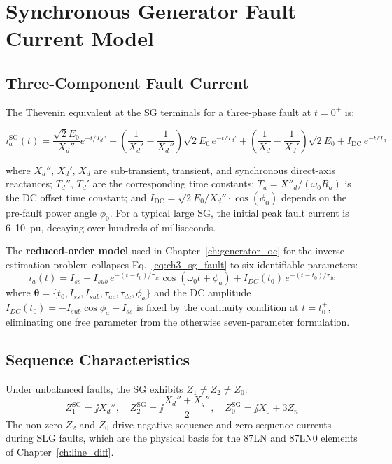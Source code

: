\section{Synchronous Generator Fault Current Model}
\label{sec:ch3_sg}

\subsection{Three-Component Fault Current}

The Thevenin equivalent at the SG terminals for a three-phase fault at $t=0^+$ is:

\begin{equation}
  i_a^\mathrm{SG}(t) =
    \frac{\sqrt{2} E_0}{X_d''} e^{-t/T_d''}
    + \left(\frac{1}{X_d'} - \frac{1}{X_d''}\right)\sqrt{2} E_0\, e^{-t/T_d'}
    + \left(\frac{1}{X_d} - \frac{1}{X_d'}\right)\sqrt{2} E_0
    + I_\mathrm{DC}\,e^{-t/T_a}
  \label{eq:ch3_sg_fault}
\end{equation}

where $X_d''$, $X_d'$, $X_d$ are sub-transient, transient, and synchronous
direct-axis reactances; $T_d''$, $T_d'$ are the corresponding time constants;
$T_a = X''_d / (\omega_0 R_a)$ is the DC offset time constant; and
$I_\mathrm{DC} = \sqrt{2} E_0 / X_d'' \cdot \cos(\phi_0)$ depends on the
pre-fault power angle $\phi_0$. For a typical large SG, the initial peak
fault current is 6--10~pu, decaying over hundreds of milliseconds.

The \textbf{reduced-order model} used in Chapter~\ref{ch:generator_oc}
for the inverse estimation problem collapses Eq.~\eqref{eq:ch3_sg_fault}
to six identifiable parameters:
\begin{equation}
  i_a(t) = I_{ss} + I_{sub}\,e^{-(t-t_0)/\tau_{ac}}\cos(\omega_0 t + \phi_a)
           + I_{DC}(t_0)\,e^{-(t-t_0)/\tau_{dc}}
  \label{eq:ch3_sg_reduced}
\end{equation}
where $\bm{\theta} = \{t_0, I_{ss}, I_{sub}, \tau_{ac}, \tau_{dc}, \phi_a\}$
and the DC amplitude $I_{DC}(t_0) = -I_{sub}\cos\phi_a - I_{ss}$
is fixed by the continuity condition at $t = t_0^+$, eliminating one
free parameter from the otherwise seven-parameter formulation.

\subsection{Sequence Characteristics}

Under unbalanced faults, the SG exhibits $Z_1 \neq Z_2 \neq Z_0$:
\begin{equation}
  Z_1^\mathrm{SG} = \jj X_d'', \quad
  Z_2^\mathrm{SG} = \jj \frac{X_d'' + X_q''}{2}, \quad
  Z_0^\mathrm{SG} = \jj X_0 + 3Z_n
  \label{eq:ch3_sg_seq_z}
\end{equation}
The non-zero $Z_2$ and $Z_0$ drive negative-sequence and zero-sequence
currents during SLG faults, which are the physical basis for the 87LN
and 87LN0 elements of Chapter~\ref{ch:line_diff}.

